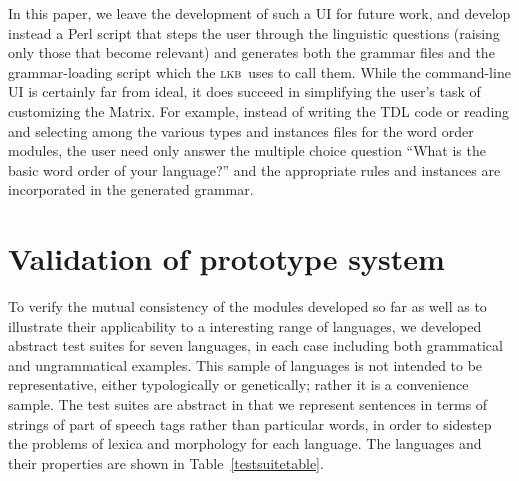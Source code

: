 \documentclass[11pt]{article}
\newcommand{\lkb}{\textsc{lkb}}
\begin{document}
In this paper, we leave the development of such a UI for future work,
and develop instead a Perl script that steps the user through the
linguistic questions (raising only those that become relevant) and
generates both the grammar files and the grammar-loading script which
the \lkb\ uses to call them.  While the command-line UI is certainly far
from ideal, it does succeed in simplifying the user's task of
customizing the Matrix.
For example, instead of writing the TDL code or reading and
selecting among the various types and instances files for the word
order modules, the user need only answer the multiple choice question
``What is the basic word order of your language?'' and the appropriate
rules and instances are incorporated in the generated grammar.


\section{Validation of prototype system}

To verify the mutual consistency of the modules developed so far as
well as to illustrate their applicability to a interesting range of
languages, we developed abstract test suites for seven languages, in
each case including both grammatical and ungrammatical examples.  This
sample of languages is not intended to be representative, either
typologically or genetically; rather it is a convenience sample.  The
test suites are abstract in that we represent sentences in terms of
strings of part of speech tags rather than particular words, in order
to sidestep the problems of lexica and morphology for each language.
The languages and their properties are shown in
Table~\ref{testsuitetable}.
\end{document}
